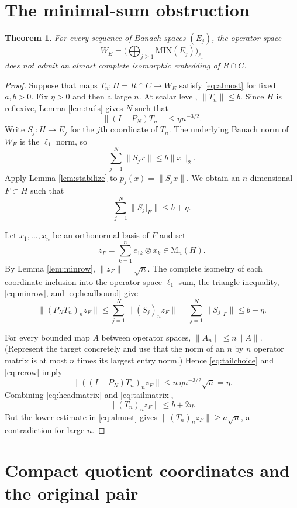 \documentclass[11pt]{article}
\newtheorem{theorem}{Theorem}
\newcommand{\MIN}{\mathrm{MIN}}
\newcommand{\M}{\mathrm M}
\begin{document}
\section{The minimal-sum obstruction}

\begin{theorem}\label{thm:minsum}
For every sequence of Banach spaces $(E_j)$, the operator space
\[
 W_E=\Big(\bigoplus_{j\geq1}\MIN(E_j)\Big)_{\ell_1}
\]
does not admit an almost complete isomorphic embedding of $R\cap C$.
\end{theorem}

\begin{proof}
Suppose that maps $T_n:H=R\cap C\to W_E$ satisfy \eqref{eq:almost} for fixed
$a,b>0$.  Fix $\eta>0$ and then a large $n$.  At scalar level,
$\|T_n\|\leq b$.  Since $H$ is reflexive, Lemma \ref{lem:tails} gives $N$ such
that
\[
 \|(I-P_N)T_n\|\leq\eta n^{-3/2}. \tag{7}\label{eq:tailchoice}
\]
Write $S_j:H\to E_j$ for the $j$th coordinate of $T_n$.  The underlying
Banach norm of $W_E$ is the $\ell_1$ norm, so
\[
 \sum_{j=1}^N\|S_jx\|\leq b\|x\|_2.
\]
Apply Lemma \ref{lem:stabilize} to $p_j(x)=\|S_jx\|$.  We obtain an
$n$-dimensional $F\subset H$ such that
\[
 \sum_{j=1}^N\|S_j|_F\|\leq b+\eta. \tag{8}\label{eq:headbound}
\]

Let $x_1,\ldots,x_n$ be an orthonormal basis of $F$ and set
\[
 z_F=\sum_{k=1}^ne_{1k}\otimes x_k\in\M_n(H).
\]
By Lemma \ref{lem:minrow}, $\|z_F\|=\sqrt n$.  The complete isometry of each
coordinate inclusion into the operator-space $\ell_1$ sum, the triangle
inequality, \eqref{eq:minrow}, and \eqref{eq:headbound} give
\[
 \|(P_NT_n)_n z_F\|
 \leq\sum_{j=1}^N\|(S_j)_n z_F\|
 =\sum_{j=1}^N\|S_j|_F\|
 \leq b+\eta. \tag{9}\label{eq:headmatrix}
\]

For every bounded map $A$ between operator spaces,
$\|A_n\|\leq n\|A\|$.  (Represent the target concretely and use that the norm
of an $n$ by $n$ operator matrix is at most $n$ times its largest entry
norm.)  Hence \eqref{eq:tailchoice} and \eqref{eq:rcrow} imply
\[
 \|((I-P_N)T_n)_n z_F\|
 \leq n\,\eta n^{-3/2}\sqrt n=\eta. \tag{10}\label{eq:tailmatrix}
\]
Combining \eqref{eq:headmatrix} and \eqref{eq:tailmatrix},
\[
 \|(T_n)_n z_F\|\leq b+2\eta.
\]
But the lower estimate in \eqref{eq:almost} gives
$\|(T_n)_n z_F\|\geq a\sqrt n$, a contradiction for large $n$.
\end{proof}

\section{Compact quotient coordinates and the original pair}
\end{document}
